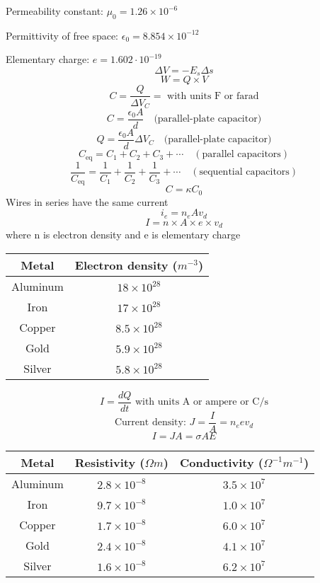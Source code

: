 \documentclass[twocolumn]{article}
\begin{document}
Permeability constant: $\mu_0 = 1.26\times 10^{-6}$

Permittivity of free space: $\epsilon_0 = 8.854\times 10^{-12}$

Elementary charge: $e = 1.602\cdot 10^{-19}$
\[\Delta V=-E_s\Delta s\]
\[W=Q\times V\]
\[C=\frac{Q}{\Delta V_C}= \text{ with units F or farad}\]
\[C=\frac{\epsilon_0 A}{d}\quad\text{(parallel-plate capacitor)}\]
\[Q=\frac{\epsilon_0 A}{d}\Delta V_C\quad\text{(parallel-plate capacitor)}\]
\[C_\text{eq}=C_1 + C_2 + C_3 + \cdots\quad (\text{parallel capacitors})\]
\[\frac{1}{C_\text{eq}}=\frac{1}{C_1} + \frac{1}{C_2} + \frac{1}{C_3} + \cdots\quad (\text{sequential capacitors})\]
\[C=\kappa C_0\]
Wires in series have the same current
\[i_e = n_e Av_d\]
\[I=n\times A\times e\times v_d\] where n is electron density and e is elementary charge
\begin{center}
    \begin{tabular}{|c c|} 
        \hline
        Metal & Electron density ($m^{-3}$) \\ [0.5ex]
        \hline
        Aluminum & $18\times 10^{28}$ \\
        \hline
        Iron & $17\times 10^{28}$ \\
        \hline
        Copper & $8.5\times 10^{28}$ \\
        \hline
        Gold & $5.9\times 10^{28}$ \\
        \hline
        Silver & $5.8\times 10^{28}$ \\
        \hline
    \end{tabular}
\end{center}
\[I=\frac{dQ}{dt} \text{ with units A or ampere or C/s}\]
\[\text{Current density: } J=\frac{I}{A}=n_e e v_d\]
\[I=JA=\sigma AE\]
\begin{center}
    \begin{tabular}{|c c c|} 
        \hline
        Metal & Resistivity ($\Omega m$) & Conductivity ($\Omega^{-1} m^{-1}$) \\ [0.5ex]
        \hline
        Aluminum & $2.8\times 10^{-8}$ & $3.5\times 10^7$ \\
        \hline
        Iron & $9.7\times 10^{-8}$ & $1.0\times 10^7$ \\
        \hline
        Copper & $1.7 \times 10^{-8}$ & $6.0\times 10^7$ \\
        \hline
        Gold & $2.4\times 10^{-8}$ & $4.1\times 10^7$ \\
        \hline
        Silver & $1.6\times 10^{-8}$ & $6.2\times 10^7$ \\
        \hline
    \end{tabular}
\end{center}
\end{document}

